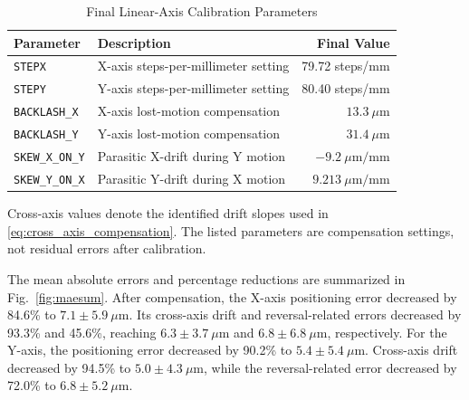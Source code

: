 \documentclass[journal]{IEEEtran}
\newcommand{\figref}[1]{Fig.~\ref{#1}}
\begin{document}
\begin{table}[htbp]
    \centering
    \caption{Final Linear-Axis Calibration Parameters}
    \label{tab:parameter_final_kalibrasi}
    \footnotesize
    \setlength{\tabcolsep}{4pt}
    \renewcommand{\arraystretch}{1.15}

    \begin{tabularx}{\linewidth}{@{} l L r @{}}
        \toprule
        \textbf{Parameter} &
        \textbf{Description} &
        \textbf{Final Value} \\
        \midrule

        \texttt{STEPX} &
        X-axis steps-per-millimeter setting &
        79.72 steps/mm \\

        \texttt{STEPY} &
        Y-axis steps-per-millimeter setting &
        80.40 steps/mm \\
        \midrule

        \texttt{BACKLASH\_X} &
        X-axis lost-motion compensation &
        $13.3~\mu\text{m}$ \\

        \texttt{BACKLASH\_Y} &
        Y-axis lost-motion compensation &
        $31.4~\mu\text{m}$ \\
        \midrule

        \texttt{SKEW\_X\_ON\_Y} &
        Parasitic X-drift during Y motion &
        $-9.2~\mu\text{m/mm}$ \\

        \texttt{SKEW\_Y\_ON\_X} &
        Parasitic Y-drift during X motion &
        $9.213~\mu\text{m/mm}$ \\
        \bottomrule
    \end{tabularx}

    \smallskip
    \parbox{\linewidth}{\footnotesize
    Cross-axis values denote the identified drift
    slopes used in
    \eqref{eq:cross_axis_compensation}.
    The listed parameters are compensation settings,
    not residual errors after calibration.}
\end{table}

The mean absolute errors and percentage reductions
are summarized in \figref{fig:maesum}.
After compensation, the X-axis positioning error
decreased by 84.6\% to
$7.1\pm5.9~\mu\text{m}$.
Its cross-axis drift and reversal-related errors
decreased by 93.3\% and 45.6\%, reaching
$6.3\pm3.7~\mu\text{m}$ and
$6.8\pm6.8~\mu\text{m}$, respectively.
For the Y-axis, the positioning error decreased
by 90.2\% to $5.4\pm5.4~\mu\text{m}$.
Cross-axis drift decreased by 94.5\% to
$5.0\pm4.3~\mu\text{m}$, while the
reversal-related error decreased by 72.0\%
to $6.8\pm5.2~\mu\text{m}$.
\end{document}
